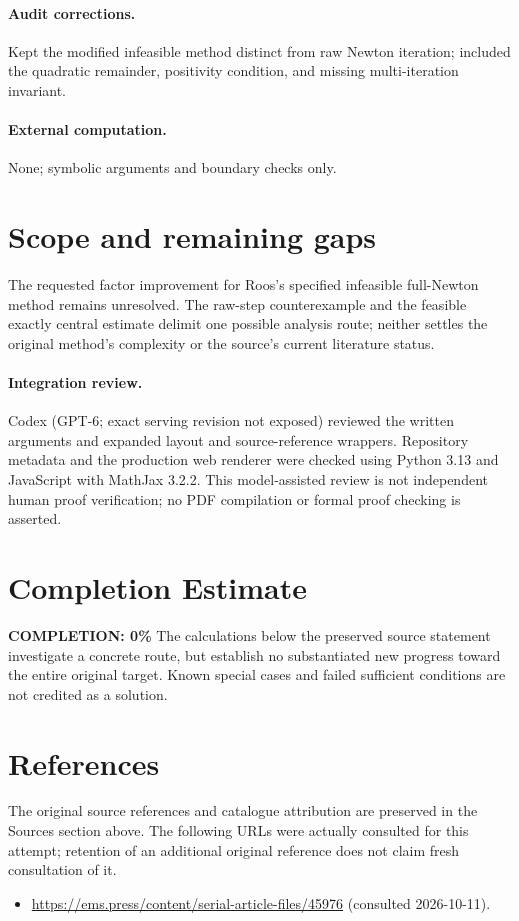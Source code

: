 \documentclass[11pt]{article}
\begin{document}
\paragraph{Audit corrections.} Kept the modified infeasible method distinct from raw Newton iteration; included the quadratic remainder, positivity condition, and missing multi-iteration invariant.
\paragraph{External computation.} None; symbolic arguments and boundary checks only.
\section{Scope and remaining gaps}
The requested factor improvement for Roos's specified infeasible full-Newton method remains unresolved. The raw-step counterexample and the feasible exactly central estimate delimit one possible analysis route; neither settles the original method's complexity or the source's current literature status.
\paragraph{Integration review.} Codex (GPT-6; exact serving revision not exposed) reviewed the written arguments and expanded layout and source-reference wrappers. Repository metadata and the production web renderer were checked using Python 3.13 and JavaScript with MathJax 3.2.2. This model-assisted review is not independent human proof verification; no PDF compilation or formal proof checking is asserted.

\section{Completion Estimate}
\noindent\textbf{COMPLETION: 0\%}
The calculations below the preserved source statement investigate a concrete route,
but establish no substantiated new progress toward the entire original target.
Known special cases and failed sufficient conditions are not credited as a solution.
\section{References}
The original source references and catalogue attribution are preserved in the
Sources section above. The following URLs were actually consulted for this attempt;
retention of an additional original reference does not claim fresh consultation of it.
\begin{itemize}
\item \url{https://ems.press/content/serial-article-files/45976} (consulted 2026-10-11). 
\end{itemize}
\end{document}
